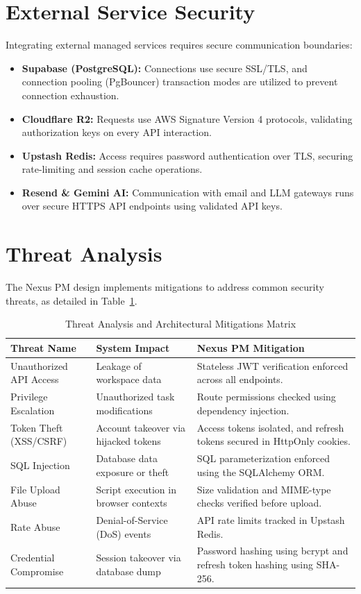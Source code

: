 \section{External Service Security}
Integrating external managed services requires secure communication boundaries:
\begin{itemize}
    \item \textbf{Supabase (PostgreSQL):} Connections use secure SSL/TLS, and connection pooling (PgBouncer) transaction modes are utilized to prevent connection exhaustion.
    \item \textbf{Cloudflare R2:} Requests use AWS Signature Version 4 protocols, validating authorization keys on every API interaction.
    \item \textbf{Upstash Redis:} Access requires password authentication over TLS, securing rate-limiting and session cache operations.
    \item \textbf{Resend \& Gemini AI:} Communication with email and LLM gateways runs over secure HTTPS API endpoints using validated API keys.
\end{itemize}

\pagebreak
\section{Threat Analysis}
The Nexus PM design implements mitigations to address common security threats, as detailed in Table~\ref{tab:threat_mitigation}.

\begin{table}[h!]
\centering
\small
\renewcommand{\arraystretch}{1.4}
\begin{tabularx}{\textwidth}{l X X}
    \toprule[1.5pt]
    \rowcolor{primary!5}
    \textbf{\color{primary}Threat Name} & \textbf{\color{primary}System Impact} & \textbf{\color{primary}Nexus PM Mitigation} \\
    \midrule
    Unauthorized API Access & Leakage of workspace data & Stateless JWT verification enforced across all endpoints. \\
    Privilege Escalation & Unauthorized task modifications & Route permissions checked using dependency injection. \\
    Token Theft (XSS/CSRF) & Account takeover via hijacked tokens & Access tokens isolated, and refresh tokens secured in HttpOnly cookies. \\
    SQL Injection & Database data exposure or theft & SQL parameterization enforced using the SQLAlchemy ORM. \\
    File Upload Abuse & Script execution in browser contexts & Size validation and MIME-type checks verified before upload. \\
    Rate Abuse & Denial-of-Service (DoS) events & API rate limits tracked in Upstash Redis. \\
    Credential Compromise & Session takeover via database dump & Password hashing using bcrypt and refresh token hashing using SHA-256. \\
    \bottomrule[1.5pt]
\end{tabularx}
\caption{Threat Analysis and Architectural Mitigations Matrix}
\label{tab:threat_mitigation}
\end{table}

